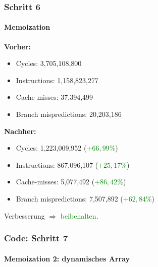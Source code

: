 \documentclass{beamer}
\newcommand{\success}[1]{\textcolor{green}{#1}}
\begin{document}
  \begin{frame}
  	\frametitle{Schritt 6}
  	\framesubtitle{Memoization}
  	\textbf{Vorher:}
		\begin{itemize}
			\item Cycles: 3,705,108,800 \\
			\item Instructions: 1,158,823,277\\
			\item Cache-misses: 37,394,499\\
			\item Branch mispredictions: 20,203,186\\
		\end{itemize}

		\textbf{Nachher:}
		\begin{itemize}
			\item Cycles: 1,223,009,952 (\success{$+ 66,99\%$})\\
			\item Instructions: 867,096,107 (\success{$+ 25,17\%$})\\
			\item Cache-misses: 5,077,492 (\success{$+ 86,42\%$})\\
			\item Branch mispredictions: 7,507,892 (\success{$+ 62,84\%$})\\
		\end{itemize}
		Verbesserung $\Rightarrow$ \success{beibehalten}.
  \end{frame}

	\begin{frame}
  	\frametitle{Code: Schritt 7}
  	\framesubtitle{Memoization 2: dynamisches Array}
  	\sMemoTwo
  \end{frame}
\end{document}
